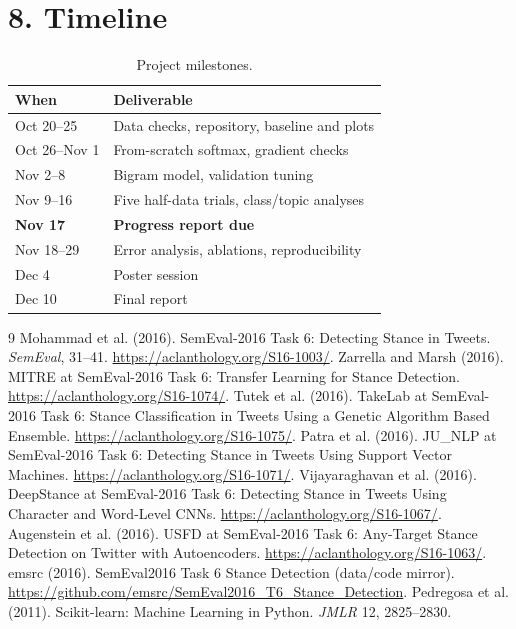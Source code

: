 \documentclass[9pt,twocolumn]{extarticle}
\begin{document}
\section*{8. Timeline}
\begin{table}[h]\centering\small\caption{Project milestones.}\begin{tabular}{p{}p{}}\toprule When & Deliverable\\\midrule Oct 20--25 & Data checks, repository, baseline and plots\\ Oct 26--Nov 1 & From-scratch softmax, gradient checks\\ Nov 2--8 & Bigram model, validation tuning\\ Nov 9--16 & Five half-data trials, class/topic analyses\\ \textbf{Nov 17} & \textbf{Progress report due}\\ Nov 18--29 & Error analysis, ablations, reproducibility\\ Dec 4 & Poster session\\ Dec 10 & Final report\\\bottomrule\end{tabular}\end{table}
\clearpage
\begin{thebibliography}{9}\small
{} Mohammad et al. (2016). SemEval-2016 Task 6: Detecting Stance in Tweets. \emph{SemEval}, 31--41. \url{https://aclanthology.org/S16-1003/}.
 Zarrella and Marsh (2016). MITRE at SemEval-2016 Task 6: Transfer Learning for Stance Detection. \url{https://aclanthology.org/S16-1074/}.
 Tutek et al. (2016). TakeLab at SemEval-2016 Task 6: Stance Classification in Tweets Using a Genetic Algorithm Based Ensemble. \url{https://aclanthology.org/S16-1075/}.
 Patra et al. (2016). JU\_NLP at SemEval-2016 Task 6: Detecting Stance in Tweets Using Support Vector Machines. \url{https://aclanthology.org/S16-1071/}.
 Vijayaraghavan et al. (2016). DeepStance at SemEval-2016 Task 6: Detecting Stance in Tweets Using Character and Word-Level CNNs. \url{https://aclanthology.org/S16-1067/}.
 Augenstein et al. (2016). USFD at SemEval-2016 Task 6: Any-Target Stance Detection on Twitter with Autoencoders. \url{https://aclanthology.org/S16-1063/}.
 emsrc (2016). SemEval2016 Task 6 Stance Detection (data/code mirror). \url{https://github.com/emsrc/SemEval2016_T6_Stance_Detection}.
 Pedregosa et al. (2011). Scikit-learn: Machine Learning in Python. \emph{JMLR} 12, 2825--2830.
\end{thebibliography}
\end{document}
